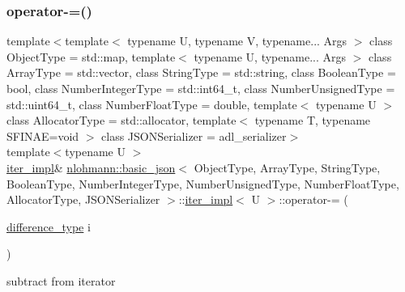 \subsubsection{\texorpdfstring{operator-\/=()}{operator-=()}}
{\footnotesize\ttfamily template$<$template$<$ typename U, typename V, typename... Args $>$ class Object\+Type = std\+::map, template$<$ typename U, typename... Args $>$ class Array\+Type = std\+::vector, class String\+Type  = std\+::string, class Boolean\+Type  = bool, class Number\+Integer\+Type  = std\+::int64\+\_\+t, class Number\+Unsigned\+Type  = std\+::uint64\+\_\+t, class Number\+Float\+Type  = double, template$<$ typename U $>$ class Allocator\+Type = std\+::allocator, template$<$ typename T, typename S\+F\+I\+N\+A\+E=void $>$ class J\+S\+O\+N\+Serializer = adl\+\_\+serializer$>$ \\
template$<$typename U $>$ \\
\mbox{\hyperlink{classnlohmann_1_1basic__json_1_1iter__impl}{iter\+\_\+impl}}\& \mbox{\hyperlink{classnlohmann_1_1basic__json}{nlohmann\+::basic\+\_\+json}}$<$ Object\+Type, Array\+Type, String\+Type, Boolean\+Type, Number\+Integer\+Type, Number\+Unsigned\+Type, Number\+Float\+Type, Allocator\+Type, J\+S\+O\+N\+Serializer $>$\+::\mbox{\hyperlink{classnlohmann_1_1basic__json_1_1iter__impl}{iter\+\_\+impl}}$<$ U $>$\+::operator-\/= (\begin{DoxyParamCaption}\item[{\mbox{\hyperlink{classnlohmann_1_1basic__json_1_1iter__impl_aa3d908ee643e5938d32e5f6d261d7715}{difference\+\_\+type}}}]{i }\end{DoxyParamCaption})\hspace{0.3cm}{\ttfamily [inline]}}



subtract from iterator 

